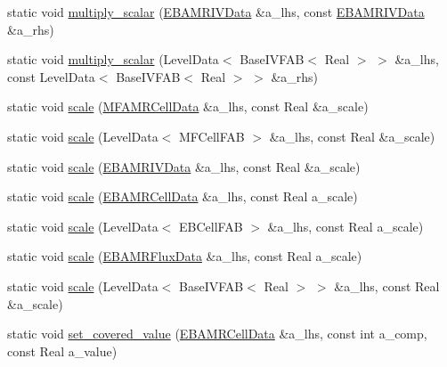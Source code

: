 \begin{DoxyCompactItemize}
static void \hyperlink{classdata__ops_a9da1cf654decd73b2980919dc1a2da5a}{multiply\+\_\+scalar} (\hyperlink{type__definitions_8H_a6b8fa905d55cbb491b52180386f0e0c1}{E\+B\+A\+M\+R\+I\+V\+Data} \&a\+\_\+lhs, const \hyperlink{type__definitions_8H_a6b8fa905d55cbb491b52180386f0e0c1}{E\+B\+A\+M\+R\+I\+V\+Data} \&a\+\_\+rhs)
\item 
static void \hyperlink{classdata__ops_ad1a2e36b5bec5c0873ac22e5a7be9603}{multiply\+\_\+scalar} (Level\+Data$<$ Base\+I\+V\+F\+AB$<$ Real $>$ $>$ \&a\+\_\+lhs, const Level\+Data$<$ Base\+I\+V\+F\+AB$<$ Real $>$ $>$ \&a\+\_\+rhs)
\item 
static void \hyperlink{classdata__ops_afbdc5fe8261e5c1a988f00c99ab0dd20}{scale} (\hyperlink{type__definitions_8H_aced885351d40daa466564acbee4042d3}{M\+F\+A\+M\+R\+Cell\+Data} \&a\+\_\+lhs, const Real \&a\+\_\+scale)
\item 
static void \hyperlink{classdata__ops_ae7012709699fc17149543aad98c3ec0c}{scale} (Level\+Data$<$ M\+F\+Cell\+F\+AB $>$ \&a\+\_\+lhs, const Real \&a\+\_\+scale)
\item 
static void \hyperlink{classdata__ops_a353b49145f01a22eccd57d60b39f4006}{scale} (\hyperlink{type__definitions_8H_a6b8fa905d55cbb491b52180386f0e0c1}{E\+B\+A\+M\+R\+I\+V\+Data} \&a\+\_\+lhs, const Real \&a\+\_\+scale)
\item 
static void \hyperlink{classdata__ops_a4d961fbd099d6d6e516c95e99a5769e4}{scale} (\hyperlink{type__definitions_8H_a7e610f301989e5e07781c5e338bdb7c3}{E\+B\+A\+M\+R\+Cell\+Data} \&a\+\_\+lhs, const Real a\+\_\+scale)
\item 
static void \hyperlink{classdata__ops_a17df3cf62b4229fc4bf4248e0724958d}{scale} (Level\+Data$<$ E\+B\+Cell\+F\+AB $>$ \&a\+\_\+lhs, const Real a\+\_\+scale)
\item 
static void \hyperlink{classdata__ops_a2c534558f43e7e907707321d40124828}{scale} (\hyperlink{type__definitions_8H_aadad278b2e5d3d4abcf9032f90ba78c3}{E\+B\+A\+M\+R\+Flux\+Data} \&a\+\_\+lhs, const Real a\+\_\+scale)
\item 
static void \hyperlink{classdata__ops_a7cc27bf88499d7b4a88061750f164851}{scale} (Level\+Data$<$ Base\+I\+V\+F\+AB$<$ Real $>$ $>$ \&a\+\_\+lhs, const Real \&a\+\_\+scale)
\item 
static void \hyperlink{classdata__ops_a0e46ba4e1b766cafea33ea47b19375ea}{set\+\_\+covered\+\_\+value} (\hyperlink{type__definitions_8H_a7e610f301989e5e07781c5e338bdb7c3}{E\+B\+A\+M\+R\+Cell\+Data} \&a\+\_\+lhs, const int a\+\_\+comp, const Real a\+\_\+value)
\item 

\end{DoxyCompactItemize}
